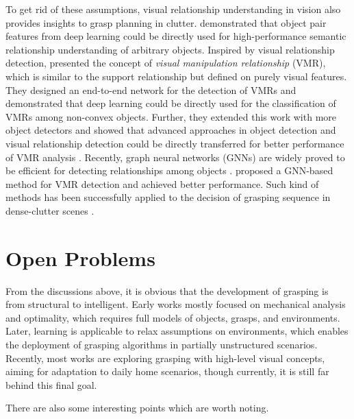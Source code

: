 \documentclass[letterpaper,10pt]{article}
\begin{document}
To get rid of these assumptions, visual relationship understanding \cite{lu2016visual} in vision also provides insights to grasp planning in clutter.
\cite{lu2016visual} demonstrated that object pair features from deep learning could be directly used for high-performance semantic relationship understanding of arbitrary objects.
Inspired by visual relationship detection, \cite{zhang2018visual} presented the concept of {\it visual manipulation relationship} (VMR), which is similar to the support relationship but defined on purely visual features.
They designed an end-to-end network for the detection of VMRs and demonstrated that deep learning could be directly used for the classification of VMRs among non-convex objects.
Further, they extended this work with more object detectors and showed that advanced approaches in object detection and visual relationship detection could be directly transferred for better performance of VMR analysis \cite{zhang2020visual}.
Recently, graph neural networks (GNNs) are widely proved to be efficient for detecting relationships among objects \cite{wu2020comprehensive, zhang2020deep}.
\cite{zuo2021graph} proposed a GNN-based method for VMR detection and achieved better performance.
Such kind of methods has been successfully applied to the decision of grasping sequence in dense-clutter scenes \cite{zhang2019multi, park2020single, zhang2021invigorate}.


\section{Open Problems}
\label{sec:future}

From the discussions above, it is obvious that the development of grasping is from structural to intelligent.
Early works mostly focused on mechanical analysis and optimality, which requires full models of objects, grasps, and environments.
Later, learning is applicable to relax assumptions on environments, which enables the deployment of grasping algorithms in partially unstructured scenarios.
Recently, most works are exploring grasping with high-level visual concepts, aiming for adaptation to daily home scenarios, though currently, it is still far behind this final goal.

There are also some interesting points which are worth noting.
\end{document}
